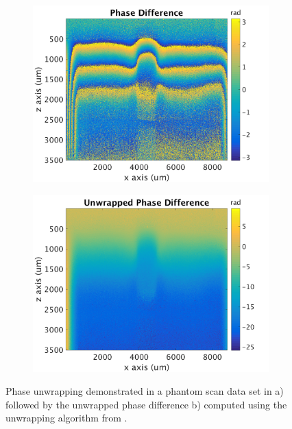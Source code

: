 \begin{figure}[t]
	\centering
	\begin{subfigure}{0.49\textwidth}
		\centering
		\includegraphics[width=\textwidth]{figures/phase_difference.png}
	\end{subfigure}
	\begin{subfigure}{0.49\textwidth}
		\centering
		\includegraphics[width=\textwidth]{figures/unwrapped_phase.png}
	\end{subfigure}
	\caption{Phase unwrapping demonstrated in a phantom scan data set in a) followed by the unwrapped phase difference b) computed using the unwrapping algorithm from \cite{kennedy_optical_2014}.}
	\label{phase_wrapping}	
\end{figure}

